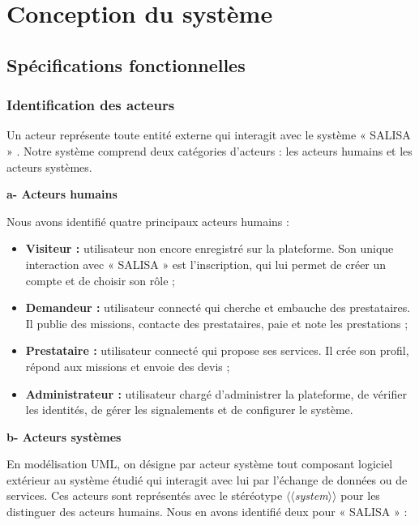 \section{Conception du système}

\subsection{Spécifications fonctionnelles}

\subsubsection{Identification des acteurs}

Un acteur représente toute entité externe qui interagit avec le système « SALISA » \cite{jacobson_up}. Notre système comprend deux catégories d'acteurs : les acteurs humains et les acteurs systèmes.

\vspace{0.3cm}
\noindent\textbf{\textcolor{vertCongo}{a- Acteurs humains}}

\vspace{0.2cm}
Nous avons identifié quatre principaux acteurs humains :

\begin{itemize}
	\item \textbf{Visiteur :} utilisateur non encore enregistré sur la plateforme. Son unique interaction avec « SALISA » est l'inscription, qui lui permet de créer un compte et de choisir son rôle ;
	\item \textbf{Demandeur :} utilisateur connecté qui cherche et embauche des prestataires. Il publie des missions, contacte des prestataires, paie et note les prestations ;
	\item \textbf{Prestataire :} utilisateur connecté qui propose ses services. Il crée son profil, répond aux missions et envoie des devis ;
	\item \textbf{Administrateur :} utilisateur chargé d'administrer la plateforme, de vérifier les identités, de gérer les signalements et de configurer le système.
\end{itemize}

\vspace{0.3cm}
\noindent\textbf{\textcolor{vertCongo}{b- Acteurs systèmes}}

\vspace{0.2cm}
En modélisation UML, on désigne par acteur système tout composant logiciel extérieur au système étudié qui interagit avec lui par l'échange de données ou de services. Ces acteurs sont représentés avec le stéréotype \textit{$\langle\langle$system$\rangle\rangle$} pour les distinguer des acteurs humains. Nous en avons identifié deux pour « SALISA » :

